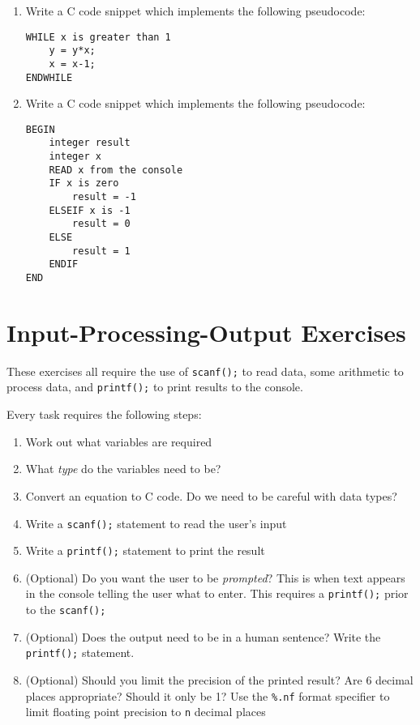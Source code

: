 \documentclass{lab}
\begin{document}
\begin{enumerate}
\item Write a C code snippet which implements the following pseudocode:
\begin{lstlisting}[style=pseudo]
WHILE x is greater than 1
	y = y*x;
	x = x-1;
ENDWHILE
\end{lstlisting}
\pagebreak
\item Write a C code snippet which implements the following pseudocode:
\begin{lstlisting}[style=pseudo]
BEGIN
	integer result
	integer x
	READ x from the console
	IF x is zero
		result = -1
	ELSEIF x is -1
		result = 0
	ELSE
		result = 1
	ENDIF
END
\end{lstlisting}
\end{enumerate}




\pagebreak
\section{Input-Processing-Output Exercises}

These exercises all require the use of \texttt{scanf();} to read data, some arithmetic to process data, and \texttt{printf();} to print results to the console.

Every task requires the following steps:

\begin{enumerate}
\item Work out what variables are required
\item What \textit{type} do the variables need to be?
\item Convert an equation to C code. Do we need to be careful with data types?
\item Write a \texttt{scanf();} statement to read the user's input
\item Write a \texttt{printf();} statement to print the result
\item (Optional) Do you want the user to be \textit{prompted}? This is when text appears in the console telling the user what to enter. This requires a \texttt{printf();} prior to the \texttt{scanf();}
\item (Optional) Does the output need to be in a human sentence? Write the \texttt{printf();} statement.
\item (Optional) Should you limit the precision of the printed result? Are 6 decimal places appropriate? Should it only be 1? Use the \texttt{\%.nf} format specifier to limit floating point precision to \texttt{n} decimal places
\end{enumerate}
\end{document}
